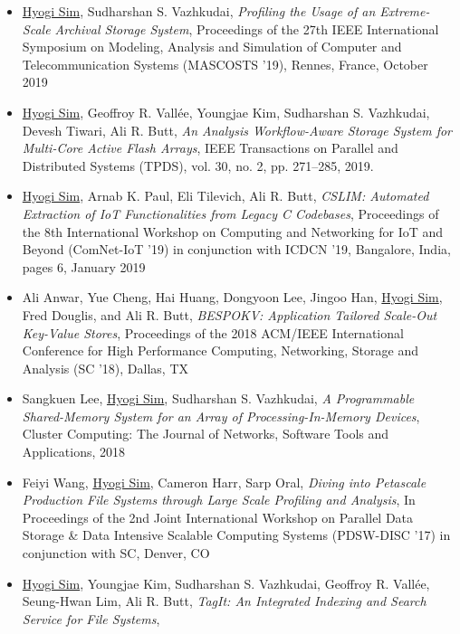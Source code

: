 \begin{itemize}
    \item \underline{Hyogi Sim}, Sudharshan S. Vazhkudai,
        {\it Profiling the Usage of an Extreme-Scale Archival Storage System},
        Proceedings of the 27th IEEE International Symposium on Modeling, Analysis and Simulation of Computer and Telecommunication Systems
        (MASCOSTS '19), Rennes, France, October 2019
    \item \underline{Hyogi Sim}, Geoffroy R. Vall\'ee,
        Youngjae Kim, Sudharshan S. Vazhkudai, Devesh Tiwari, Ali R. Butt,
        {\it An Analysis Workflow-Aware Storage System for Multi-Core Active Flash Arrays},
        IEEE Transactions on Parallel and Distributed Systems (TPDS),
        vol. 30, no. 2, pp. 271–285, 2019.
    \item \underline{Hyogi Sim}, Arnab K. Paul, Eli Tilevich, Ali R. Butt,
        {\it CSLIM: Automated Extraction of IoT Functionalities from Legacy C Codebases},
        Proceedings of the 8th International Workshop on Computing and Networking for
        IoT and Beyond (ComNet-IoT ’19) in conjunction with ICDCN '19, Bangalore,
        India, pages 6, January 2019
    \item Ali Anwar, Yue Cheng, Hai Huang, Dongyoon Lee, Jingoo Han, \underline{Hyogi Sim},
        Fred Douglis, and Ali R. Butt,
        {\it BESPOKV: Application Tailored Scale-Out Key-Value Stores},
        Proceedings of the 2018 ACM/IEEE International Conference for High
        Performance Computing, Networking, Storage and Analysis (SC '18), Dallas, TX
    \item Sangkuen Lee, \underline{Hyogi Sim}, Sudharshan S. Vazhkudai,
        {\it A Programmable Shared-Memory System for an Array of Processing-In-Memory Devices},
        Cluster Computing: The Journal of Networks, Software Tools and Applications, 2018
    \item Feiyi Wang, \underline{Hyogi Sim}, Cameron Harr, Sarp Oral,
        {\it Diving into Petascale Production File Systems through
        Large Scale Profiling and Analysis},
        In Proceedings of the 2nd Joint International Workshop on Parallel Data Storage
        \& Data Intensive Scalable Computing Systems (PDSW-DISC '17)
        in conjunction with SC, Denver, CO
    \item \underline{Hyogi Sim}, Youngjae Kim, Sudharshan S. Vazhkudai,
        Geoffroy R. Vall\'ee, Seung-Hwan Lim, Ali R. Butt,
        {\it TagIt: An Integrated Indexing and Search Service for File Systems},

\end{itemize}
